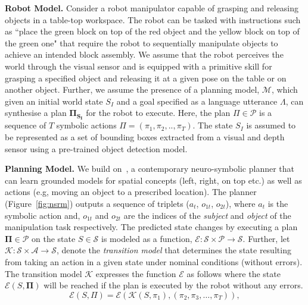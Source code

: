 \textbf{Robot Model. }
Consider a robot manipulator capable of grasping and releasing objects in a table-top workspace. 
%
The robot can be tasked with instructions such as ``place the green block on top of the red object and the yellow block on top of the green one" that require the robot to sequentially manipulate objects to achieve an intended block assembly. 
%
We assume that the robot perceives the world through the visual sensor and is equipped with a primitive skill for grasping a specified object and releasing it at a given pose on the table or on another object. 
%
Further, we assume the presence of a planning model, $\mathcal{M}$, which given an initial world state $S_I$ and a goal specified as a language utterance $\mathit{\Lambda}$, can synthesise a plan $\mathbf{\Pi_{S_I}}$ for the robot to execute. 
%
Here, the plan $\Pi \in \mathcal{P}$ is a sequence of $T$ symbolic actions $\Pi = (\pi_1, \pi_2, .., \pi_T)$. The state $S_I$ is assumed to be represented as a set of bounding boxes extracted from a visual and depth sensor using a pre-trained object detection model. 

%
\textbf{Planning Model. }
%
We build on~\citep{Kalithasan2022LearningNP}, a contemporary neuro-symbolic planner that can learn grounded models for spatial concepts (left, right, on top etc.) as well as actions (e.g, moving an object to a prescribed location). 
%
The planner (Figure~\ref{fig:nsrm}) outputs a sequence of triplets ($a_t$, $o_{1t}$, $o_{2t}$), where $a_t$ is the symbolic action and, $o_{1t}$ and $o_{2t}$ are the indices of the \textit{subject} and \textit{object} of the manipulation task respectively. 
%
The predicted state changes by executing a plan $\mathbf{\Pi} \in \mathcal{P}$ on the state $S \in \mathcal{S}$ is modeled as a function, $\mathcal{E}: \mathcal{S} \times \mathcal{P} \rightarrow \mathcal{S}$. 
%
Further, let $\mathcal{K}: \mathcal{S} \times \mathcal{A} \rightarrow \mathcal{S}$, denote the \emph{transition model} that determines the state resulting from taking an action in a given state under nominal conditions (without errors). The transition model  $\mathcal{K}$ expresses the function $\mathcal{E}$ as follows where the state $\mathcal{E}(S, \mathbf{\Pi})$ will be reached if the plan is executed by the robot without any errors. 
%
\begin{equation}
    \mathcal{E}(S, \Pi) = \mathcal{E}(\mathcal{K}(S, \pi_1), (\pi_2, \pi_3, \dots, \pi_T)),
\end{equation}

